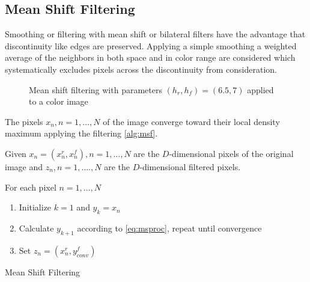 \subsection{Mean Shift Filtering} %
\label{sub:mean_shift_filtering}
Smoothing or filtering with mean shift or bilateral filters have the advantage
that discontinuity like edges are preserved. Applying a simple smoothing a 
weighted average of the neighbors in both space and in color range are considered
which systematically excludes pixels across the discontinuity from consideration.

\begin{figure}[ht]
\centering
{}%
%
\caption{Mean shift filtering with parameters $(h_r, h_f) = (6.5, 7)$ applied to a color image}
\label{fig:filtsample}
\end{figure}

The pixels $x_n, n = 1, \ldots, N$ of the image converge toward their local density
maximum applying the filtering  \autoref{alg:msf}. 

\begin{algorithm2e}[H]
Given $x_n = (x_n^r, x_n^f), n = 1, \ldots , N$ are the $D$-dimensional pixels
of the original image and $z_n, n = 1 , \ldots. , N$ are the $D$-dimensional
filtered pixels.

For each pixel $n = 1, \ldots , N$
\begin{enumerate}%
 \item Initialize $k = 1$ and $y_k = x_n$
 \item Calculate $y_{k+1}$ according to \autoref{eq:msproc}, repeat until 
	convergence
 \item Set $z_n = (x_n^r, y_{conv}^f)$
\end{enumerate}

\caption{Mean Shift Filtering}
\label{alg:msf}
\end{algorithm2e}


